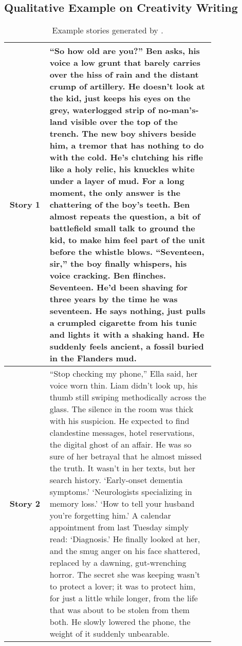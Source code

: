 \subsection{Qualitative Example on Creativity Writing}



\begin{table}[!htbp]
    \centering
    \caption{Example stories generated by \ours.}
    \label{tab:example_stories}
    \begin{tabular}{c p{0.8\linewidth}}
    \toprule
    \textbf{Story 1} & “So how old are you?” Ben asks, his voice a low grunt that barely carries over the hiss of rain and the distant crump of artillery. He doesn’t look at the kid, just keeps his eyes on the grey, waterlogged strip of no-man's-land visible over the top of the trench. The new boy shivers beside him, a tremor that has nothing to do with the cold. He’s clutching his rifle like a holy relic, his knuckles white under a layer of mud. For a long moment, the only answer is the chattering of the boy’s teeth. Ben almost repeats the question, a bit of battlefield small talk to ground the kid, to make him feel part of the unit before the whistle blows. “Seventeen, sir,” the boy finally whispers, his voice cracking. Ben flinches. Seventeen. He’d been shaving for three years by the time he was seventeen. He says nothing, just pulls a crumpled cigarette from his tunic and lights it with a shaking hand. He suddenly feels ancient, a fossil buried in the Flanders mud. \\
    \midrule
    \textbf{Story 2} & “Stop checking my phone,” Ella said, her voice worn thin. Liam didn’t look up, his thumb still swiping methodically across the glass. The silence in the room was thick with his suspicion. He expected to find clandestine messages, hotel reservations, the digital ghost of an affair. He was so sure of her betrayal that he almost missed the truth. It wasn't in her texts, but her search history. ‘Early-onset dementia symptoms.’ ‘Neurologists specializing in memory loss.’ ‘How to tell your husband you’re forgetting him.’ A calendar appointment from last Tuesday simply read: ‘Diagnosis.’ He finally looked at her, and the smug anger on his face shattered, replaced by a dawning, gut-wrenching horror. The secret she was keeping wasn't to protect a lover; it was to protect him, for just a little while longer, from the life that was about to be stolen from them both. He slowly lowered the phone, the weight of it suddenly unbearable. \\
    \bottomrule
    \end{tabular}
\end{table}



